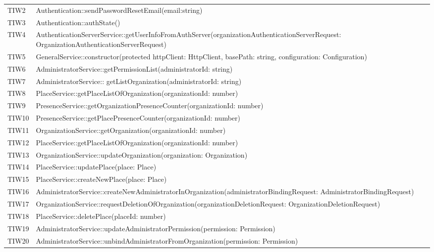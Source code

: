 {\begin{longtable}{C{2cm} C{12cm}}
	TIW2 & Authentication::sendPasswordResetEmail(email:string) \\
	TIW3 & Authentication::authState()\\
	TIW4 & AuthenticationServerService::getUserInfoFromAuthServer(organizationAuthenticationServerRequest: OrganizationAuthenticationServerRequest) \\
	TIW5 & GeneralService::constructor(protected httpClient: HttpClient, basePath: string, configuration: Configuration) \\
	TIW6 & AdministratorService::getPermissionList(administratorId: string)\\
	TIW7 & AdministratorService:: getListOrganization(administratorId: string)\\
	TIW8 & PlaceService::getPlaceListOfOrganization(organizationId: number)\\
	TIW9 & PresenceService::getOrganizationPresenceCounter(organizationId: number)\\
	TIW10 & PresenceService::getPlacePresenceCounter(organizationId: number)\\
	TIW11 & OrganizationService::getOrganization(organizationId: number)\\
	TIW12 & PlaceService::getPlaceListOfOrganization(organizationId: number)\\
	TIW13 & OrganizationService::updateOrganization(organization: Organization)\\
	TIW14 & PlaceService::updatePlace(place: Place)\\
	TIW15 & PlaceService::createNewPlace(place: Place)\\
	TIW16 & AdministratorService::createNewAdministratorInOrganization(administratorBindingRequest: AdministratorBindingRequest)\\
	TIW17 & OrganizationService::requestDeletionOfOrganization(organizationDeletionRequest: OrganizationDeletionRequest)\\
	TIW18 & PlaceService::deletePlace(placeId: number)\\
	TIW19 & AdministratorService::updateAdministratorPermission(permission: Permission)\\
	TIW20 & AdministratorService::unbindAdministratorFromOrganization(permission: Permission)\\


\end{longtable}
}
